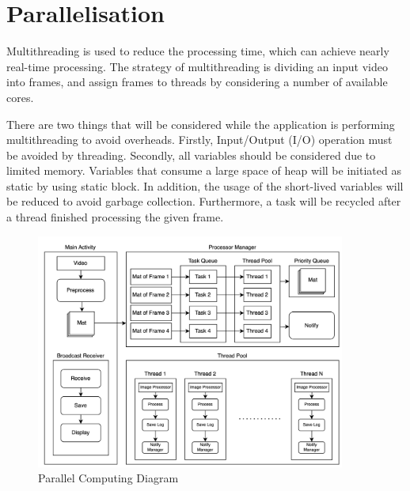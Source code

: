     \section{Parallelisation}
        Multithreading is used to reduce the processing time, which can achieve nearly real-time processing.
        The strategy of multithreading is dividing an input video into frames,
        and assign frames to threads by considering a number of available cores.

         There are two things that will be considered while the application is performing multithreading to avoid overheads.
        Firstly, Input/Output (I/O) operation must be avoided by threading.
        Secondly, all variables should be considered due to limited memory.
            Variables that consume a large space of heap will be initiated as static by using static block.
            In addition, the usage of the short-lived variables will be reduced to avoid garbage collection.
            Furthermore, a task will be recycled after a thread finished processing the given frame.

        \begin{figure}[!ht]
            \centering
            \includegraphics[width=4in]{images/chapter3/parallel.png}
            \caption{Parallel Computing Diagram}
            \label{parallelJava}
        \end{figure}

